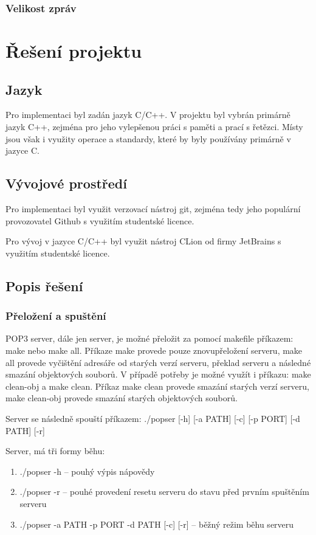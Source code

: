 \documentclass[11pt,a4paper]{report}
\begin{document}
    \subsubsection{Velikost zpráv}
    \label{subsec:mailsize}

    \clearpage
    \section{Řešení projektu}
    \subsection{Jazyk}
    Pro implementaci byl zadán jazyk C/C++. V projektu byl vybrán primárně jazyk C++, zejména pro jeho vylepšenou práci s paměti a prací s řetězci. Místy jsou však i využity operace a standardy, které by byly používány primárně v jazyce C.
    \subsection{Vývojové prostředí}
    Pro implementaci byl využit verzovací nástroj git, zejména tedy jeho populární provozovatel Github s využitím studentské licence.\par
    Pro vývoj v jazyce C/C++ byl využit nástroj CLion od firmy JetBrains s využitím studentské licence.
    \subsection{Popis řešení}
    \subsubsection{Přeložení a spuštění}
    \label{subsec:makeandrun}
    POP3 server, dále jen server, je možné přeložit za pomocí makefile příkazem: make nebo make all. Příkaze make provede pouze znovupřeložení serveru, make all provede vyčištění adresáře od starých verzí serveru, překlad serveru a následné smazání objektových souborů.
    V případě potřeby je možné využít i příkazu: make clean-obj a make clean. Příkaz make clean provede smazání starých verzí serveru, make clean-obj provede smazání starých objektových souborů.\par
    Server se následně spouští příkazem: ./popser [-h] [-a PATH] [-c] [-p PORT] [-d PATH] [-r]\par
    Server, má tři formy běhu:
    \begin{enumerate}
        \item ./popser -h -- pouhý výpis nápovědy
        \item ./popser -r -- pouhé provedení resetu serveru do stavu před prvním spuštěním serveru
        \item ./popser -a PATH -p PORT -d PATH [-c] [-r] -- běžný režim běhu serveru
    \end{enumerate}
\end{document}
